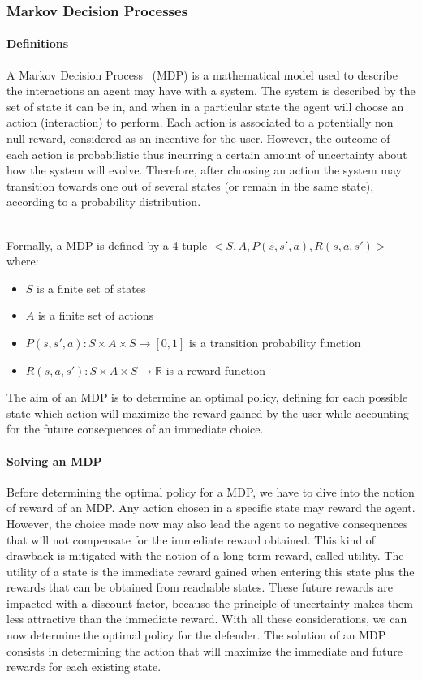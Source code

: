 \subsubsection{Markov Decision Processes}

\paragraph{Definitions}
A Markov Decision Process~\cite{bellman1957} (MDP) is a mathematical model used to describe the interactions  an agent may have with a system.
The system is described by the set of state it can be in, and when in a particular state the agent will choose an action (interaction) to perform.
Each action is associated to a potentially non null reward, considered as an incentive for the user.
However, the outcome of each action is probabilistic thus incurring a certain amount of uncertainty about how the system will evolve.
Therefore, after choosing an action the system may transition towards one out of several states (or remain in the same state), according to a probability distribution.



\textbf{\\}
Formally, a MDP is defined by a 4-tuple $<S,A,P(s,s',a),R(s,a,s')>$ where:
\begin{itemize}
    \item $S$ is a finite set of states
    \item $A$ is a finite set of actions
    \item $P(s,s',a) : S \times A \times S \longrightarrow [0,1]$ is a transition probability function
    \item $R(s,a,s') : S \times A \times S \longrightarrow \mathbb{R}$ is a reward function
\end{itemize}

The aim of an MDP is to determine an optimal policy, defining for each possible state which action will maximize the reward gained by the user while accounting for the future consequences of an immediate choice.


\paragraph{Solving an MDP}
\label{sec:optimalpolicy}
Before determining the optimal policy for a MDP, we have to dive into the notion of reward of an MDP. Any action chosen in a specific state may reward the agent. However, the choice made now may also lead the agent to negative consequences that will not compensate for the immediate reward obtained. 
This kind of drawback is mitigated with the notion of a long term reward, called utility. The utility of a state is the immediate reward gained when entering this state plus the rewards that can be obtained from reachable states.
These future rewards are impacted with a discount factor, because the principle of uncertainty makes them less attractive than the immediate reward.
With all these considerations, we can now determine the optimal policy for the defender.
The solution of an MDP consists in determining the action that will maximize the immediate and future rewards for each existing state.

